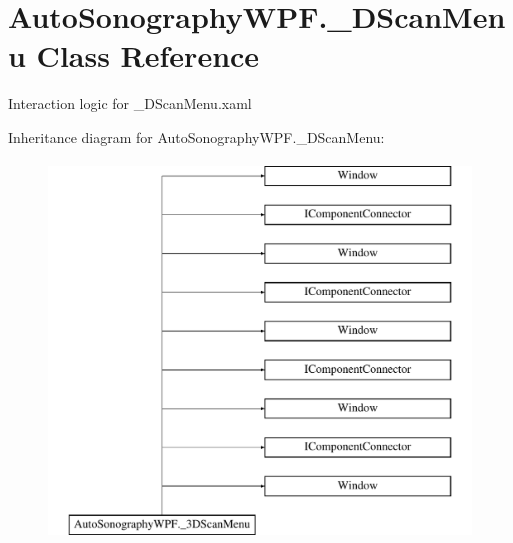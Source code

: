 \hypertarget{class_auto_sonography_w_p_f_1_1__3_d_scan_menu}{}\section{Auto\+Sonography\+W\+P\+F.\+\_\+D\+Scan\+Menu Class Reference}
\label{class_auto_sonography_w_p_f_1_1__3_d_scan_menu}


Interaction logic for \+\_\+D\+Scan\+Menu.\+xaml  


Inheritance diagram for Auto\+Sonography\+W\+P\+F.\+\_\+D\+Scan\+Menu\+:\begin{figure}[H]
\begin{center}
\leavevmode
\includegraphics[height=10.000000cm]{class_auto_sonography_w_p_f_1_1__3_d_scan_menu}
\end{center}
\end{figure}
